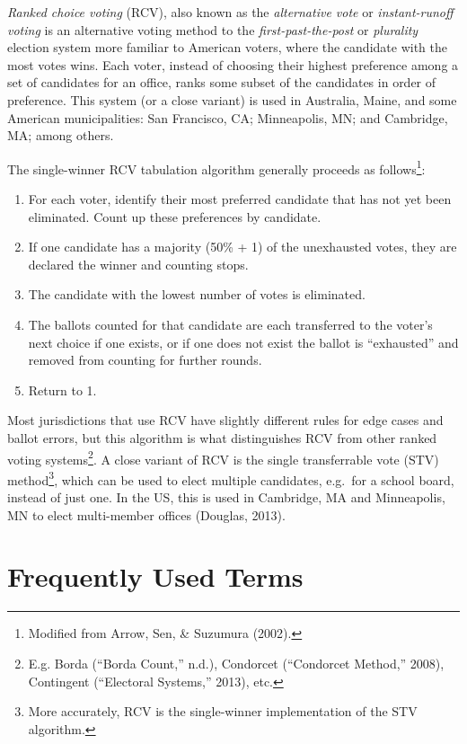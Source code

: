 \documentclass[12pt,twoside]{reedthesis}
\begin{document}
\emph{Ranked choice voting} (RCV), also known as the \emph{alternative vote} or \emph{instant-runoff voting} is an alternative voting method to the \emph{first-past-the-post} or \emph{plurality} election system more familiar to American voters, where the candidate with the most votes wins. Each voter, instead of choosing their highest preference among a set of candidates for an office, ranks some subset of the candidates in order of preference. This system (or a close variant) is used in Australia, Maine, and some American municipalities: San Francisco, CA; Minneapolis, MN; and Cambridge, MA; among others.

The single-winner RCV tabulation algorithm generally proceeds as follows\footnote{Modified from Arrow, Sen, \& Suzumura (2002).}:
\begin{enumerate}
\def\labelenumi{\arabic{enumi}.}
\item
  For each voter, identify their most preferred candidate that has not yet been eliminated. Count up these preferences by candidate.
\item
  If one candidate has a majority (50\% + 1) of the unexhausted votes, they are declared the winner and counting stops.
\item
  The candidate with the lowest number of votes is eliminated.
\item
  The ballots counted for that candidate are each transferred to the voter's next choice if one exists, or if one does not exist the ballot is ``exhausted'' and removed from counting for further rounds.
\item
  Return to 1.
\end{enumerate}
Most jurisdictions that use RCV have slightly different rules for edge cases and ballot errors, but this algorithm is what distinguishes RCV from other ranked voting systems\footnote{E.g. Borda (``Borda Count,'' n.d.), Condorcet (``Condorcet Method,'' 2008), Contingent (``Electoral Systems,'' 2013), etc.}. A close variant of RCV is the single transferrable vote (STV) method\footnote{More accurately, RCV is the single-winner implementation of the STV algorithm.}, which can be used to elect multiple candidates, e.g.~for a school board, instead of just one. In the US, this is used in Cambridge, MA and Minneapolis, MN to elect multi-member offices (Douglas, 2013).

\hypertarget{frequently-used-terms}{%
\section{Frequently Used Terms}\label{frequently-used-terms}}
\end{document}
